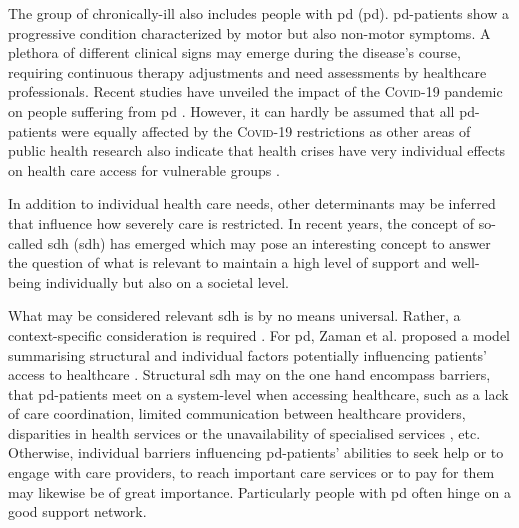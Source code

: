 \documentclass{bmcart}
\begin{document}
The group of chronically-ill also includes people with \acl{pd} (\acs{pd}). \ac{pd}-patients show a progressive condition characterized by motor but also non-motor symptoms. A plethora of different clinical signs may emerge during the disease's course, requiring continuous therapy adjustments and need assessments by healthcare professionals. Recent studies have unveiled the impact of the \textsc{Covid}-19 pandemic on people suffering from \ac{pd} \cite{yogev2021covid, zipprich2020knowledge, frundt2022impact, richter2021analysis, brooks2021social}. However, it can hardly be assumed that all \ac{pd}-patients were equally affected by the \textsc{Covid}-19 restrictions as other areas of public health research also indicate that health crises have very individual effects on health care access for vulnerable groups \cite{huijts2017prevalence, lowcock2012social, whocovidbrief}. 

In addition to individual health care needs, other determinants may be inferred that influence how severely care is restricted. In recent years, the concept of so-called \acl{sdh} (\acs{sdh}) has emerged \cite{brown2020effect, world2010conceptual} which may pose an interesting concept to answer the question of what is relevant to maintain a high level of support and well-being individually but also on a societal level.


What may be considered relevant \ac{sdh} is by no means universal. Rather, a context-specific consideration is required \cite{world2010conceptual}. For \ac{pd}, Zaman et al. proposed a model summarising structural and individual factors potentially influencing patients' access to healthcare \cite{zaman2021barriers}. Structural \ac{sdh} may on the one hand encompass barriers, that \ac{pd}-patients meet on a system-level when accessing healthcare, such as a lack of care coordination, limited communication between healthcare providers, disparities in health services or the unavailability of specialised services \cite{zaman2021barriers}, etc. Otherwise, individual barriers influencing \ac{pd}-patients' abilities to seek help or to engage with care providers, to reach important care services or to pay for them \cite{zaman2021barriers} may likewise be of great importance. Particularly people with \ac{pd} often hinge on a good support network. 
\end{document}
